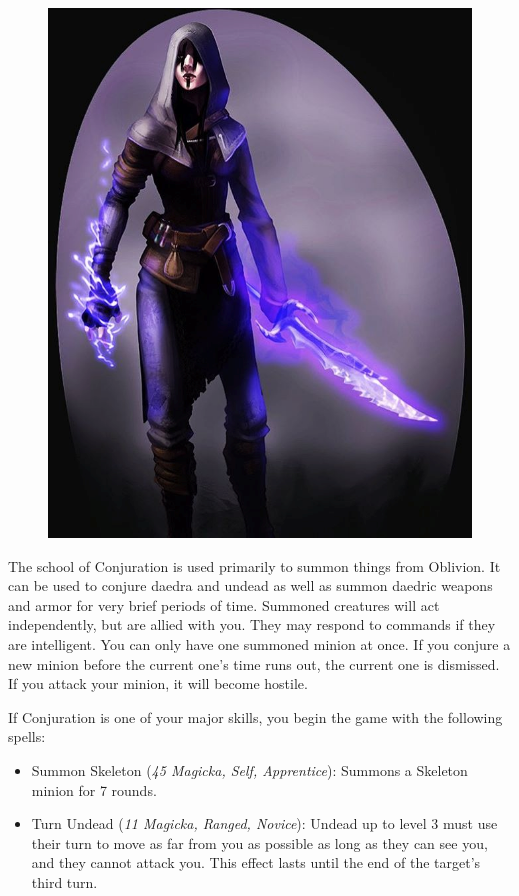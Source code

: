 \documentclass[12pt]{book}
\begin{document}
\begin{figure}
	\includegraphics[width=\textwidth]{conjurer.png}
\end{figure}

The school of Conjuration is used primarily to summon things from Oblivion. It can be used to conjure daedra and undead as well as summon daedric weapons and armor for very brief periods of time. Summoned creatures will act independently, but are allied with you. They may respond to commands if they are intelligent. You can only have one summoned minion at once. If you conjure a new minion before the current one's time runs out, the current one is dismissed. If you attack your minion, it will become hostile.

If Conjuration is one of your major skills, you begin the game with the following spells:
\begin{itemize}
	\item Summon Skeleton (\textit{45 Magicka, Self, Apprentice}): Summons a Skeleton minion for 7 rounds.
	\item Turn Undead (\textit{11 Magicka, Ranged, Novice}): Undead up to level 3 must use their turn to move as far from you as possible as long as they can see you, and they cannot attack you. This effect lasts until the end of the target's third turn.
\end{itemize}
\end{document}
